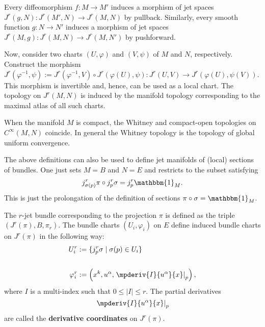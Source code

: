     \begin{property}[Topology]
        Every diffeomorphism $f:M\rightarrow M'$ induces a morphism of jet spaces $J^r(g,N):J^r(M',N)\rightarrow J^r(M,N)$ by pullback. Similarly, every smooth function $g:N\rightarrow N'$ induces a morphism of jet spaces $J^r(M,g):J^r(M,N)\rightarrow J^r(M,N')$ by pushforward.

        Now, consider two charts $(U,\varphi)$ and $(V,\psi)$ of $M$ and $N$, respectively. Construct the morphism $J^r(\varphi^{-1},\psi):=J^r(\varphi^{-1},V)\circ J^r(\varphi(U),\psi):J^r(U,V)\rightarrow J^r(\varphi(U),\psi(V))$. This morphism is invertible and, hence, can be used as a local chart. The topology on $J^r(M,N)$ is induced by the manifold topology corresponding to the maximal atlas of all such charts.
    \end{property}
    \begin{property}
        When the manifold $M$ is compact, the Whitney and compact-open topologies on $C^\infty(M,N)$ coincide. In general the Whitney topology is the topology of global uniform convergence.
    \end{property}

    \begin{remark}
        The above definitions can also be used to define jet manifolds of (local) sections of bundles. One just sets $M=B$ and $N=E$ and restricts to the subset satisfying
        \begin{gather}
            j^r_{\sigma(p)}\pi\circ j^r_p\sigma=j^r_p\mathbbm{1}_M.
        \end{gather}
        This is just the prolongation of the definition of sections $\pi\circ\sigma=\mathbbm{1}_M$.

        The $r$-jet bundle corresponding to the projection $\pi$ is defined as the triple $(J^r(\pi),B,\pi_r)$. The bundle charts $(U_i,\varphi_i)$ on $E$ define induced bundle charts on $J^r(\pi)$ in the following way:
        \begin{align}
            U_i^r &:= \{j_p^r\sigma\mid\sigma(p)\in U_i\}\\\nonumber\\
            \varphi_i^r &:= \left(x^k,u^\alpha,\left.\mpderiv{I}{u^\alpha}{x}\right|_p\right),
        \end{align}
        where $I$ is a multi-index such that $0\leq|I|\leq r$. The partial derivatives \[\left.\mpderiv{I}{u^\alpha}{x}\right|_p\] are called the \textbf{derivative coordinates} on $J^r(\pi)$.
    \end{remark}

